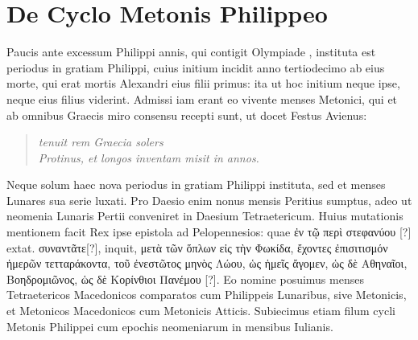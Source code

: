 \section{De Cyclo Metonis Philippeo}
%
\begin{table}[btp]
 
\end{table}
%
\begin{table}[t]
 
\end{table}
%
Paucis ante excessum Philippi annis, qui contigit Olympiade
, instituta est periodus in gratiam Philippi, cuius initium incidit
anno tertiodecimo ab eius morte, qui erat mortis Alexandri
eius filii primus: ita ut hoc initium neque ipse, neque eius filius viderint.
Admissi iam erant eo vivente menses Metonici, qui et ab omnibus
Graecis miro consensu recepti sunt, ut docet Festus Avienus:
\begin{verse}
\emd{} \textit{tenuit rem Graecia solers}\\
\textit{Protinus, et longos inventam misit in annos.}
\end{verse}
Neque solum haec nova periodus in gratiam Philippi instituta, sed et
menses Lunares sua serie luxati.
Pro Daesio enim nonus mensis Peritius
sumptus, adeo ut neomenia Lunaris Pertii conveniret in Daesium
Tetraetericum.
%
Huius mutationis mentionem
facit Rex ipse epistola ad Pelopennesios:
quae \textgreek{ἐν τῷ περὶ στεφανύου [?]} extat.
\textgreek{συναντᾶτε[?]},
inquit, \textgreek{μετὰ τῶν ὅπλων εἰς τὴν Φωκίδα,
 ἔχοντες ἐπισιτισμόν ἡμερῶν τετταράκοντα,
τοῦ ἐνεστῶτος μηνὸς Λώου, ὡς ἡμεῖς ἄγομεν, ὡς δὲ Αθηναῖοι, Βοηδρομιῶνος,
ὡς δὲ Κορίνθιοι Πανέμου [?]}.
Eo nomine posuimus menses Tetraetericos
Macedonicos comparatos cum Philippeis Lunaribus, sive
Metonicis, et Metonicos Macedonicos cum Metonicis Atticis.
Subiecimus etiam filum cycli Metonis Philippei cum epochis neomeniarum
in mensibus Iulianis.
%
